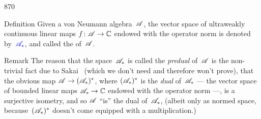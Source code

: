 \begin{parsec}{870}%
\begin{point}{10}{Definition}%
Given a von Neumann algebra~$\mathscr{A}$,
the vector space of ultraweakly continuous 
linear maps $f\colon \mathscr{A}\to \mathbb{C}$
endowed with the operator norm
is denoted by~$\Define{\scrA_*}$,%
and called the %
of~$\mathscr{A}$.
\begin{point}{20}{Remark}%
The reason
that the space~$\mathscr{A}_*$ is called the \emph{predual}
of~$\mathscr{A}$
is the non-trivial fact due to Sakai~\cite{sakai} (which we 
don't need and therefore won't prove),
that the obvious 
map $\mathscr{A}\to(\mathscr{A}_*)^*$,
where $(\mathscr{A}_*)^*$ is the \emph{dual} of~$\mathscr{A}_*$ --- the
vector space of bounded linear maps $\mathscr{A}_*\to\mathbb{C}$
endowed with the operator norm ---,
is a surjective isometry,
and so $\mathscr{A}$ ``is'' the dual of~$\mathscr{A}_*$,
(albeit only as normed space,
because~$(\mathscr{A}_*)^*$ doesn't come equipped with a multiplication.)


\end{point}
\end{point}
\end{parsec}
